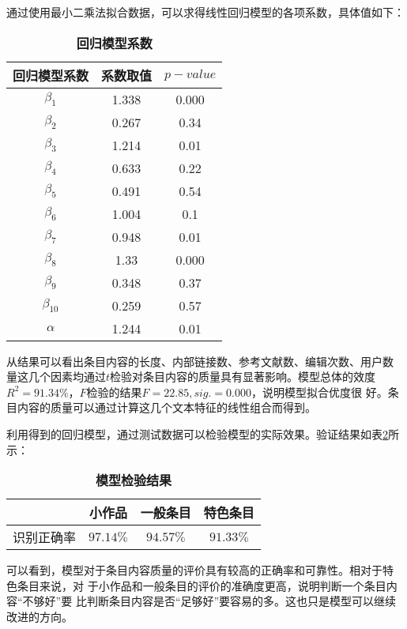 
通过使用最小二乘法拟合数据，可以求得线性回归模型的各项系数，具体值如下：
\begin{table}[!htb]
  \centering
\caption{\small{\bf{回归模型系数}}}
 \small
  \begin{tabular}{|c|c|c|}
\hline
    回归模型系数&系数取值&$p-value$\\\hline
     $\beta_1$&1.338&0.000\\\hline
$\beta_2$&0.267&0.34\\\hline
$\beta_3$&1.214&0.01\\\hline
$\beta_4$&0.633&0.22\\\hline
$\beta_5$&0.491&0.54\\\hline
$\beta_6$&1.004&0.1\\\hline
$\beta_7$&0.948&0.01\\\hline
$\beta_8$&1.33&0.000\\\hline
$\beta_9$&0.348&0.37\\\hline
$\beta_{10}$&0.259&0.57\\\hline
$\alpha$&1.244&0.01\\\hline
  \end{tabular}
  
  \label{tab:coefficient}
\end{table}

从结果可以看出条目内容的长度、内部链接数、参考文献数、编辑次数、用户数
量这几个因素均通过$t$检验对条目内容的质量具有显著影响。模型总体的效度
$R^2=91.34\%$，$F$检验的结果$F=22.85, sig.=0.000$，说明模型拟合优度很
好。条目内容的质量可以通过计算这几个文本特征的线性组合而得到。

利用得到的回归模型，通过测试数据可以检验模型的实际效果。验证结果如表\ref{tab:model-test}所
示：
\begin{table}[!htb]
  \centering
\small
\caption{\small{\bf{模型检验结果}}} 
 \begin{tabular}{|c|c|c|c|}
 \hline
    &小作品&一般条目&特色条目\\\hline
识别正确率&$97.14\%$&$94.57\%$&$91.33\%$\\\hline
  \end{tabular}
  
  \label{tab:model-test}
\end{table}
可以看到，模型对于条目内容质量的评价具有较高的正确率和可靠性。相对于特
色条目来说，对
于小作品和一般条目的评价的准确度更高，说明判断一个条目内容“不够好”要
比判断条目内容是否“足够好”要容易的多。这也只是模型可以继续改进的方向。

